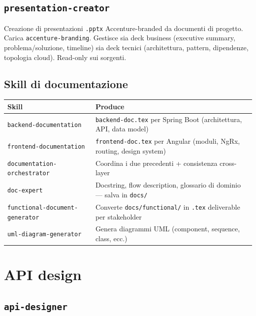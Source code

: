\documentclass[12pt,a4paper,twoside]{book}
\begin{document}
\section{\texttt{presentation-creator}}

Creazione di presentazioni \texttt{.pptx} Accenture-branded da documenti di progetto. Carica \texttt{accenture-branding}. Gestisce sia deck business (executive summary, problema/soluzione, timeline) sia deck tecnici (architettura, pattern, dipendenze, topologia cloud). Read-only sui sorgenti.

\section{Skill di documentazione}

\begin{center}
\begin{tabular}{ll}
\toprule
\textbf{Skill} & \textbf{Produce} \\
\midrule
\texttt{backend-documentation} & \texttt{backend-doc.tex} per Spring Boot (architettura, API, data model) \\
\texttt{frontend-documentation} & \texttt{frontend-doc.tex} per Angular (moduli, NgRx, routing, design system) \\
\texttt{documentation-orchestrator} & Coordina i due precedenti + consistenza cross-layer \\
\texttt{doc-expert} & Docstring, flow description, glossario di dominio — salva in \texttt{docs/} \\
\texttt{functional-document-generator} & Converte \texttt{docs/functional/} in \texttt{.tex} deliverable per stakeholder \\
\texttt{uml-diagram-generator} & Genera diagrammi UML (component, sequence, class, ecc.) \\
\bottomrule
\end{tabular}
\end{center}

\chapter{API design}

\section{\texttt{api-designer}}
\end{document}
